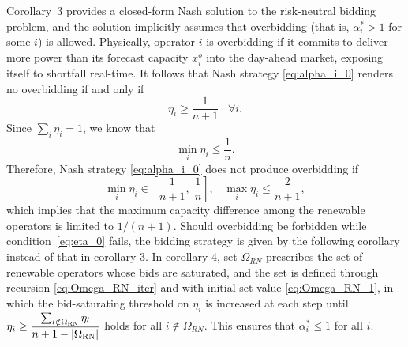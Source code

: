 \documentclass[conference]{IEEEtran}
\begin{document}
Corollary~3 provides a closed-form Nash solution to the risk-neutral bidding problem, and the solution implicitly assumes that overbidding (that is, $\alpha_i^* > 1$ for some $i$) is allowed. Physically, operator $i$ is overbidding if it commits to deliver more power than its forecast capacity $x_i^o$ into the day-ahead market, exposing itself to  shortfall real-time. It follows that Nash strategy \eqref{eq:alpha_i_0} renders no overbidding if and only if 
\begin{equation*}
    \eta_i \geq \frac{1}{n+1} \;\;\; \forall i. 
\end{equation*}
Since $\sum_i \eta_i =1$, we know that 
\[ \min_i \eta_i \leq \frac{1}{n}. \] Therefore, Nash strategy \eqref{eq:alpha_i_0} does not produce overbidding if 
\begin{equation}
    \min_i \eta_i \in \left[ \frac{1}{n+1}, \; \frac{1}{n}\right], \;\;\; 
    \max_i \eta_i \leq \frac{2}{n+1},
    \label{eq:eta_0}
\end{equation}
which implies that the maximum capacity difference among the renewable operators is limited to $1/(n+1)$. Should overbidding be forbidden while condition~\eqref{eq:eta_0} fails, the bidding strategy is given by the following corollary instead of that in corollary 3. In corollary 4, set $\Omega_{RN}$ prescribes the set of renewable operators whose bids are saturated, and the set is defined through recursion \eqref{eq:Omega_RN_iter} and with initial set value \eqref{eq:Omega_RN_1}, in which the bid-saturating threshold on $\eta_i$ is increased at each step until $\eta_i\geq\dfrac{\sum_{l\notin\Omega_{\rm RN}}\eta_l}{n+1-|\Omega_{\rm RN}|}$ holds for all $i\not\in\Omega_{RN}$. This ensures that $\alpha_i^*\leq 1$ for all $i$.  
\end{document}
